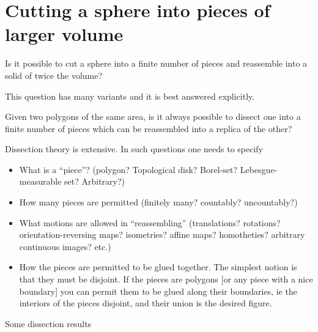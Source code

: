 \section{Cutting a sphere into pieces of larger volume}


Is it possible to cut a sphere into a finite number of pieces and
reassemble into a solid of twice the volume?

This question has many variants and it is best answered explicitly.

Given two polygons of the same area, is it always possible to dissect
one into a finite number of pieces which can be reassembled into a
replica of the other?

Dissection theory is extensive.  In such questions one needs to specify

\begin{itemize}
  \item What is a ``piece''?  (polygon?  Topological disk?  Borel-set?
  Lebesgue-measurable set?  Arbitrary?)

  \item How many pieces are permitted (finitely many? countably?
  uncountably?)

  \item What motions are allowed in ``reassembling'' (translations?
  rotations?  orientation-reversing maps?  isometries?  affine maps?
  homotheties?  arbitrary continuous images?  etc.)

  \item How the pieces are permitted to be glued together.  The simplest
  notion is that they must be disjoint.  If the pieces are polygons [or
  any piece with a nice boundary] you can permit them to be glued along
  their boundaries, ie the interiors of the pieces disjoint, and their
  union is the desired figure.
\end{itemize}

Some dissection results

